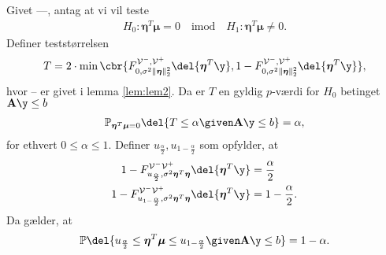 \begin{lem} \label{lem:lem3}
Givet ---, antag at vi vil teste
\begin{align*}
H_0: \boldsymbol{\eta}^T \boldsymbol{\mu}=0 \quad \text{imod} \quad H_1: \boldsymbol{\eta}^T \boldsymbol{\mu} \neq 0.
\end{align*}
Definer teststørrelsen
\begin{align}
T=2 \cdot \min\cbr{F_{0, \sigma^2 \Vert \boldsymbol{\eta} \Vert_2^2}^{\mathcal{V}^-, \mathcal{V}^+} \del{\boldsymbol{\eta}^T \y}, 1 - F_{0, \sigma^2 \Vert \boldsymbol{\eta} \Vert_2^2}^{\mathcal{V}^-, \mathcal{V}^+} \del{\boldsymbol{\eta}^T \y}}, \label{eq:post_1.18}
\end{align}
hvor -- er givet i lemma \ref{lem:lem2}.
Da er \(T\) en gyldig \(p\)-værdi for \(H_0\) betinget \(\mathbf{A} \y \leq b\)
\begin{align*}
\mathbb{P}_{\boldsymbol{\eta}^T \boldsymbol{\mu}=0} \del{T \leq \alpha \given \mathbf{A} \y \leq b} = \alpha,
\end{align*}
for ethvert \(0 \leq \alpha \leq 1\). 
Definer \(u_{\frac{\alpha}{2}}, u_{1-\frac{\alpha}{2}}\) som opfylder, at
\begin{align*}
1-F_{u_{\frac{\alpha}{2}}, \sigma^2 \boldsymbol{\eta}^T  \boldsymbol{\eta} }^{\mathcal{V}^- \mathcal{V}^+} \del{\boldsymbol{\eta}^T \y} &= \frac{\alpha}{2} \\
1-F_{u_{1-\frac{\alpha}{2}}, \sigma^2 \boldsymbol{\eta}^T  \boldsymbol{\eta} }^{\mathcal{V}^- \mathcal{V}^+} \del{\boldsymbol{\eta}^T \y} &= 1-\frac{\alpha}{2}.
\end{align*}
Da gælder, at
\begin{align*}
\mathbb{P} \del{u_{\frac{\alpha}{2}} \leq  \boldsymbol{\eta}^T \boldsymbol{\mu} \leq  u_{1-\frac{\alpha}{2}} \given \mathbf{A} \y \leq b} = 1- \alpha.
\end{align*}
\end{lem}




